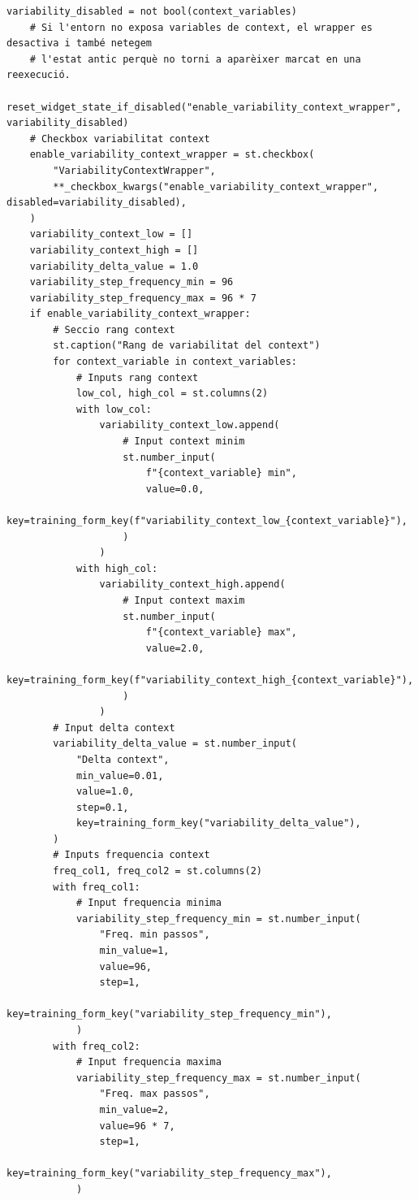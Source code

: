 \documentclass[10pt,a4paper]{article}
\begin{document}
\begin{lstlisting}[style=studioPython,caption={page\_components/training\_wrappers.py},label={lst:page-components-training-wrappers-py}]
    variability_disabled = not bool(context_variables)
    # Si l'entorn no exposa variables de context, el wrapper es desactiva i també netegem
    # l'estat antic perquè no torni a aparèixer marcat en una reexecució.
    reset_widget_state_if_disabled("enable_variability_context_wrapper", variability_disabled)
    # Checkbox variabilitat context
    enable_variability_context_wrapper = st.checkbox(
        "VariabilityContextWrapper",
        **_checkbox_kwargs("enable_variability_context_wrapper", disabled=variability_disabled),
    )
    variability_context_low = []
    variability_context_high = []
    variability_delta_value = 1.0
    variability_step_frequency_min = 96
    variability_step_frequency_max = 96 * 7
    if enable_variability_context_wrapper:
        # Seccio rang context
        st.caption("Rang de variabilitat del context")
        for context_variable in context_variables:
            # Inputs rang context
            low_col, high_col = st.columns(2)
            with low_col:
                variability_context_low.append(
                    # Input context minim
                    st.number_input(
                        f"{context_variable} min",
                        value=0.0,
                        key=training_form_key(f"variability_context_low_{context_variable}"),
                    )
                )
            with high_col:
                variability_context_high.append(
                    # Input context maxim
                    st.number_input(
                        f"{context_variable} max",
                        value=2.0,
                        key=training_form_key(f"variability_context_high_{context_variable}"),
                    )
                )
        # Input delta context
        variability_delta_value = st.number_input(
            "Delta context",
            min_value=0.01,
            value=1.0,
            step=0.1,
            key=training_form_key("variability_delta_value"),
        )
        # Inputs frequencia context
        freq_col1, freq_col2 = st.columns(2)
        with freq_col1:
            # Input frequencia minima
            variability_step_frequency_min = st.number_input(
                "Freq. min passos",
                min_value=1,
                value=96,
                step=1,
                key=training_form_key("variability_step_frequency_min"),
            )
        with freq_col2:
            # Input frequencia maxima
            variability_step_frequency_max = st.number_input(
                "Freq. max passos",
                min_value=2,
                value=96 * 7,
                step=1,
                key=training_form_key("variability_step_frequency_max"),
            )


\end{lstlisting}
\end{document}
